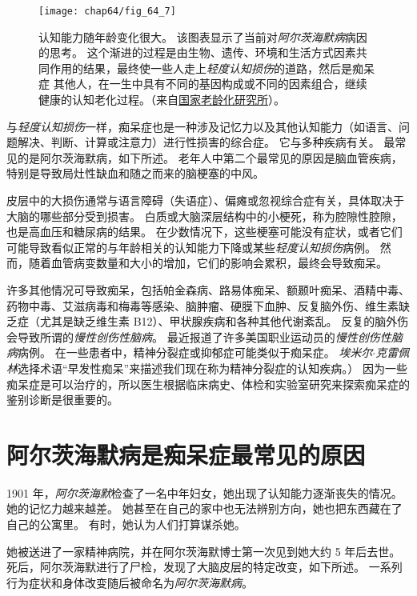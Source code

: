 \begin{figure}[htbp]
	\centering
	\texttt{[image: chap64/fig\_64\_7]}
	\caption{认知能力随年龄变化很大。
		该图表显示了当前对\textit{阿尔茨海默病}病因的思考。
		这个渐进的过程是由生物、遗传、环境和生活方式因素共同作用的结果，最终使一些人走上\textit{轻度认知损伤}的道路，然后是痴呆症
		其他人，在一生中具有不同的基因构成或不同的因素组合，继续健康的认知老化过程。（来自\href{http://www.nia.nih.gov/alzheimers/publication/part-2-what-happens-brain-ad/changing-brain-ad}{国家老龄化研究所}）。}
	\label{fig:64_7}
\end{figure}


与\textit{轻度认知损伤}一样，痴呆症也是一种涉及记忆力以及其他认知能力（如语言、问题解决、判断、计算或注意力）进行性损害的综合症。
它与多种疾病有关。
最常见的是阿尔茨海默病，如下所述。
老年人中第二个最常见的原因是脑血管疾病，特别是导致局灶性缺血和随之而来的脑梗塞的中风。


皮层中的大损伤通常与语言障碍（失语症）、偏瘫或忽视综合症有关，具体取决于大脑的哪些部分受到损害。
白质或大脑深层结构中的小梗死，称为腔隙性腔隙，也是高血压和糖尿病的结果。
在少数情况下，这些梗塞可能没有症状，或者它们可能导致看似正常的与年龄相关的认知能力下降或某些\textit{轻度认知损伤}病例。
然而，随着血管病变数量和大小的增加，它们的影响会累积，最终会导致痴呆。


许多其他情况可导致痴呆，包括帕金森病、路易体痴呆、额颞叶痴呆、酒精中毒、药物中毒、艾滋病毒和梅毒等感染、脑肿瘤、硬膜下血肿、反复脑外伤、维生素缺乏症（尤其是缺乏维生素 B12）、甲状腺疾病和各种其他代谢紊乱。
反复的脑外伤会导致所谓的\textit{慢性创伤性脑病}。
最近报道了许多美国职业运动员的\textit{慢性创伤性脑病}病例。
在一些患者中，精神分裂症或抑郁症可能类似于痴呆症。
\textit{埃米尔$\cdot$克雷佩林}选择术语“早发性痴呆”来描述我们现在称为精神分裂症的认知疾病。）
因为一些痴呆症是可以治疗的，所以医生根据临床病史、体检和实验室研究来探索痴呆症的鉴别诊断是很重要的。



\section{阿尔茨海默病是痴呆症最常见的原因}

1901 年，\textit{阿尔茨海默}检查了一名中年妇女，她出现了认知能力逐渐丧失的情况。
她的记忆力越来越差。
她甚至在自己的家中也无法辨别方向，她也把东西藏在了自己的公寓里。
有时，她认为人们打算谋杀她。


她被送进了一家精神病院，并在阿尔茨海默博士第一次见到她大约 5 年后去世。
死后，阿尔茨海默进行了尸检，发现了大脑皮层的特定改变，如下所述。
一系列行为症状和身体改变随后被命名为\textit{阿尔茨海默病}。


